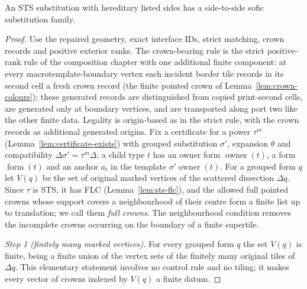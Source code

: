 \begin{theorem}\label{thm:hereditary-substitution}
An STS substitution with hereditary listed sides has a side-to-side sofic
substitution family.
\end{theorem}
\begin{proof}
Use the repaired geometry, exact interface IDs, strict matching, crown
records and positive exterior ranks.  The crown-bearing rule is the strict
positive-rank rule of the composition chapter with one additional finite
component: at every macrotemplate-boundary vertex each incident border
tile records in its second cell a fresh crown record (the finite pointed
crown of Lemma~\ref{lem:crown-colours}); these generated records are
distinguished from copied print-second cells, are generated only at
boundary vertices, and are transported along port two like the other
finite data.  Legality is origin-based as in the strict rule, with the
crown records as additional generated origins.  Fix a certificate for a
power $\tau^m$ (Lemma~\ref{lem:certificate-exists}) with grouped
substitution $\sigma'$, expansion $\theta$ and compatibility
$\Delta\sigma'=\tau^m\Delta$; a child type $t$ has an owner form
$\operatorname{owner}(t)$, a form $\operatorname{form}(t)$ and an anchor
$a_t$ in the template $\sigma'\operatorname{owner}(t)$.  For a grouped
form $q$ let $V(q)$ be the set of original marked vertices of the scattered
dissection $\Delta q$.  Since $\tau$ is STS, it has FLC
(Lemma~\ref{lem:sts-flc}), and the allowed full pointed crowns whose
support covers a neighbourhood of their centre form a finite list up to
translation; we call them \emph{full crowns}.  The neighbourhood condition
removes the incomplete crowns occurring on the boundary of a finite
supertile.

\emph{Step 1 (finitely many marked vertices).}  For every grouped form
$q$ the set $V(q)$ is finite, being a finite union of the vertex sets of the
finitely many original tiles of $\Delta q$.  This elementary statement
involves no control rule and no tiling; it makes every vector of crowns
indexed by $V(q)$ a finite datum.


\end{proof}
